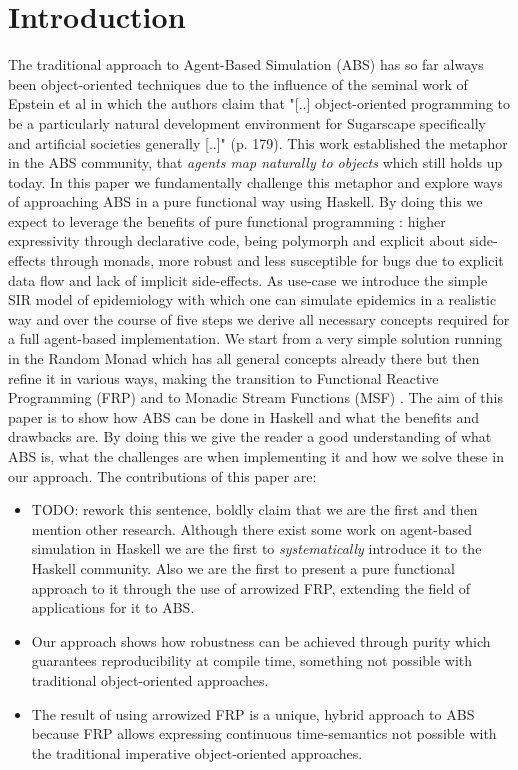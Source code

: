 \section{Introduction}
The traditional approach to Agent-Based Simulation (ABS) has so far always been object-oriented techniques due to the influence of the seminal work of Epstein et al \cite{epstein_growing_1996} in which the authors claim that "[..] object-oriented programming to be a particularly natural development environment for Sugarscape specifically and artificial societies generally [..]" (p. 179). This work established the metaphor in the ABS community, that \textit{agents map naturally to objects} \cite{north_managing_2007} which still holds up today.
In this paper we fundamentally challenge this metaphor and explore ways of approaching ABS in a pure functional way using Haskell. By doing this we expect to leverage the benefits of pure functional programming \cite{hudak_history_2007}: higher expressivity through declarative code, being polymorph and explicit about side-effects through monads, more robust and less susceptible for bugs due to explicit data flow and lack of implicit side-effects.
As use-case we introduce the simple SIR model of epidemiology with which one can simulate epidemics in a realistic way and over the course of five steps we derive all necessary concepts required for a full agent-based implementation. We start from a very simple solution running in the Random Monad which has all general concepts already there but then refine it in various ways, making the transition to Functional Reactive Programming (FRP) \cite{wan_functional_2000} and to Monadic Stream Functions (MSF) \cite{perez_functional_2016}.
The aim of this paper is to show how ABS can be done in Haskell and what the benefits and drawbacks are. By doing this we give the reader a good understanding of what ABS is, what the challenges are when implementing it and how we solve these in our approach.
The contributions of this paper are:

\begin{itemize}
	\item TODO: rework this sentence, boldly claim that we are the first and then mention other research. Although there exist some work on agent-based simulation in Haskell we are the first to \textit{systematically} introduce it to the Haskell community. Also we are the first to present a pure functional approach to it through the use of arrowized FRP, extending the field of applications for it to ABS.
	\item Our approach shows how robustness can be achieved through purity which guarantees reproducibility at compile time, something not possible with traditional object-oriented approaches.
	\item The result of using arrowized FRP is a unique, hybrid approach to ABS because FRP allows expressing continuous time-semantics not possible with the traditional imperative object-oriented approaches.
\end{itemize}


